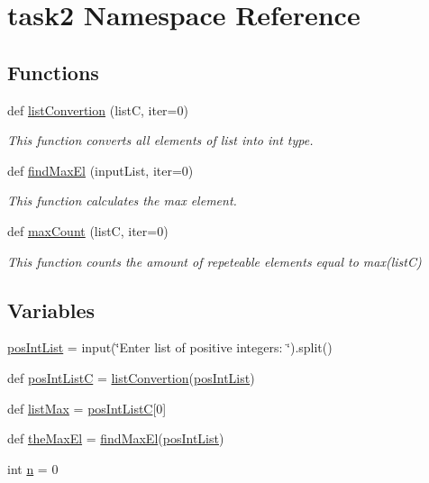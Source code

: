 \hypertarget{namespacetask2}{}\section{task2 Namespace Reference}
\label{namespacetask2}
\subsection*{Functions}
\begin{DoxyCompactItemize}
\item 
def \hyperlink{namespacetask2_af2d3e8cd162d9d507993819e98d611ee}{list\+Convertion} (listC, iter=0)
\begin{DoxyCompactList}\small\item\em This function converts all elements of list into int type. \end{DoxyCompactList}\item 
def \hyperlink{namespacetask2_ab1e91c5a3a92f52a8577e1992a218e0e}{find\+Max\+El} (input\+List, iter=0)
\begin{DoxyCompactList}\small\item\em This function calculates the max element. \end{DoxyCompactList}\item 
def \hyperlink{namespacetask2_acf4031e47d4bffcf362e885bf2a4b0c6}{max\+Count} (listC, iter=0)
\begin{DoxyCompactList}\small\item\em This function counts the amount of repeteable elements equal to max(list\+C) \end{DoxyCompactList}\end{DoxyCompactItemize}
\subsection*{Variables}
\begin{DoxyCompactItemize}
\item 
\hyperlink{namespacetask2_ae07ebbc4c73946fcc787d1c29614fb12}{pos\+Int\+List} = input(\char`\"{}Enter list of positive integers\+: \char`\"{}).split()
\item 
def \hyperlink{namespacetask2_a019b7ef0f8fda1ddb12b56f3b6585533}{pos\+Int\+ListC} = \hyperlink{namespacetask2_af2d3e8cd162d9d507993819e98d611ee}{list\+Convertion}(\hyperlink{namespacetask2_ae07ebbc4c73946fcc787d1c29614fb12}{pos\+Int\+List})
\item 
def \hyperlink{namespacetask2_a54615b31e07691d50cd02e39a051576a}{list\+Max} = \hyperlink{namespacetask2_a019b7ef0f8fda1ddb12b56f3b6585533}{pos\+Int\+ListC}\mbox{[}0\mbox{]}
\item 
def \hyperlink{namespacetask2_a0aa5c0e9a96dd2230879efc62effa19a}{the\+Max\+El} = \hyperlink{namespacetask2_ab1e91c5a3a92f52a8577e1992a218e0e}{find\+Max\+El}(\hyperlink{namespacetask2_ae07ebbc4c73946fcc787d1c29614fb12}{pos\+Int\+List})
\item 
int \hyperlink{namespacetask2_a9997b6e0b5925d8fed669755c44c01a6}{n} = 0
\end{DoxyCompactItemize}


